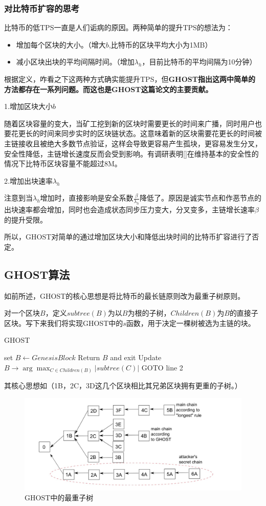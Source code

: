 \subsubsection{对比特币扩容的思考}
比特币的低TPS一直是人们诟病的原因。两种简单的提升TPS的想法为：
\begin{itemize}
	\item 增加每个区块的大小。（增大$b$,比特币的区块平均大小为1MB）
	\item 减小区块出块的平均间隔时间。（增加$\lambda_h$，目前比特币的平均间隔为10分钟）
\end{itemize}
根据定义，咋看之下这两种方式确实能提升TPS，但\textbf{GHOST指出这两中简单的方法都存在一系列问题。而这也是GHOST这篇论文的主要贡献。}

1.增加区块大小$b$

随着区块容量的变大，当矿工挖到新的区块时需要更长的时间来广播，同时用户也要花更长的时间来同步实时的区块链状态。这意味着新的区块需要花更长的时间被主链接收且被绝大多数节点验证，这样会导致更容易产生孤块，更容易发生分叉，安全性降低，主链增长速度反而会受到影响。有调研表明[]在维持基本的安全性的情况下比特币区块容量不能超过8M。

2.增加出块速率$\lambda_h$

注意到当$\lambda_h$增加时，直接影响是安全系数$\frac{\beta}{\lambda_h}$降低了。原因是诚实节点和作恶节点的出块速率都会增加，同时也会造成状态同步压力变大，分叉变多，主链增长速率$\beta$的提升受限。

所以，GHOST对简单的通过增加区块大小和降低出块时间的比特币扩容进行了否定。

\subsection{GHOST算法}
如前所述，GHOST的核心思想是将比特币的最长链原则改为最重子树原则。

对一个区块$B$，定义$subtree(B)$为以$B$为根的子树，$Children(B)$为$B$的直接子区块。写下来我们将实现GHOST中的$s$函数，用于决定一棵树被选为主链的块。

\begin{algorithm}[H]
	\caption{GHOST}%
   set $B \leftarrow Genesis Block$\;
    {Return $B$ and exit\;}
   {Update $B\rightarrow \arg\max_{C \in Children(B)}|subtree(C)|$\;}
	GOTO line 2\;
\end{algorithm}
其核心思想如（1B，2C，3D这几个区块相比其兄弟区块拥有更重的子树。）
\begin{figure}
	\centering
	\includegraphics[width=1\textwidth]{../common/GHOST_1.png}
	\caption{GHOST中的最重子树} 
	\label{fig:GHOST1}
\end{figure}



